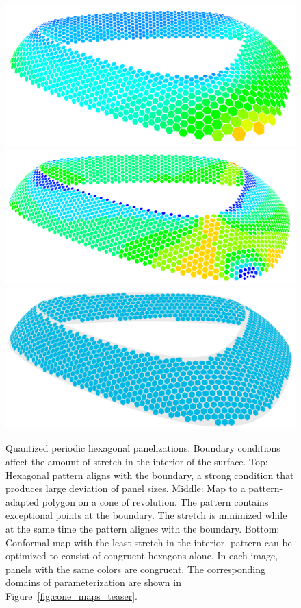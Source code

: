 \documentclass[article.tex]{subfiles}
\begin{document}
\begin{figure}[p]
  \centering
  \includegraphics[width=.89\textwidth]{images/quantized_aligned5.png}
  \includegraphics[width=.89\textwidth]{images/quantized_singularities5.png}
  \includegraphics[width=.89\textwidth]{images/quantized_isometric2.png}
  \caption{Quantized periodic hexagonal panelizations. Boundary
    conditions affect the amount of stretch in the interior of the
    surface. Top: Hexagonal pattern aligns with the boundary, a strong
    condition that produces large deviation of panel sizes. Middle:
    Map to a pattern-adapted polygon on a cone of revolution. The
    pattern contains exceptional points at the boundary. The stretch
    is minimized while at the same time the pattern alignes with the
    boundary.  Bottom: Conformal map with the least stretch in the
    interior, pattern can be optimized to consist of congruent
    hexagons alone. In each image, panels with the same colors are
    congruent. The corresponding domains of parameterization are shown
    in Figure~\ref{fig:cone_maps_teaser}.}
  \label{fig:hex_example}
\end{figure}
\end{document}
